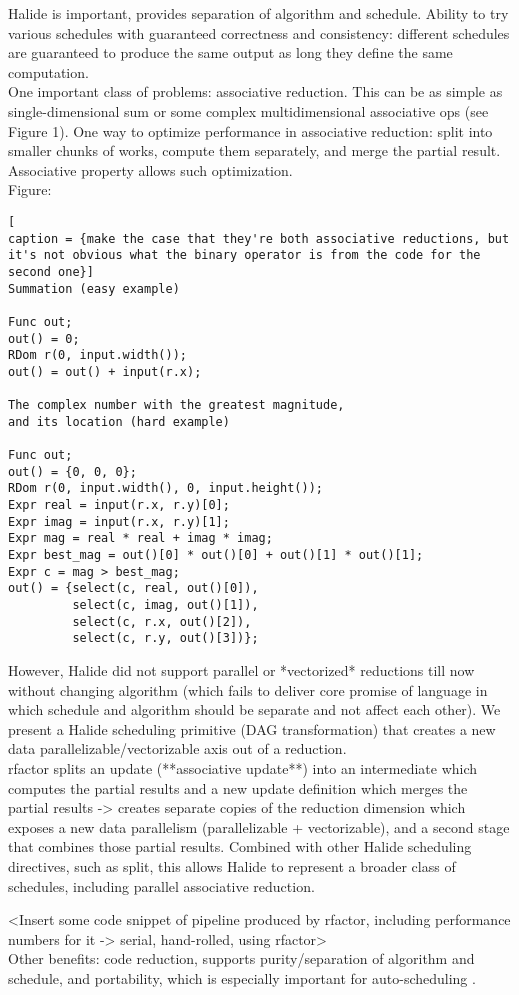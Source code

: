 Halide \cite{Ragan-Kelley:2013:HLC:2491956.2462176} is important, provides separation of algorithm and schedule. Ability to try various schedules with guaranteed correctness and consistency: different schedules are guaranteed to produce the same output as long they define the same computation. \\

One important class of problems: associative reduction. This can be as simple as single-dimensional sum or some complex multidimensional associative ops (see Figure 1). One way to optimize performance in associative reduction: split into smaller chunks of works, compute them separately, and merge the partial result. Associative property allows such optimization. \\

Figure:

\begin{lstlisting}[
caption = {make the case that they're both associative reductions, but it's not obvious what the binary operator is from the code for the second one}]
Summation (easy example)

Func out;
out() = 0;
RDom r(0, input.width());
out() = out() + input(r.x);

The complex number with the greatest magnitude, 
and its location (hard example)

Func out;
out() = {0, 0, 0};
RDom r(0, input.width(), 0, input.height());
Expr real = input(r.x, r.y)[0];
Expr imag = input(r.x, r.y)[1];
Expr mag = real * real + imag * imag;
Expr best_mag = out()[0] * out()[0] + out()[1] * out()[1];
Expr c = mag > best_mag;
out() = {select(c, real, out()[0]),
         select(c, imag, out()[1]),
         select(c, r.x, out()[2]),
         select(c, r.y, out()[3])};
\end{lstlisting}

However, Halide did not support parallel or *vectorized* reductions till now without changing algorithm (which fails to deliver core promise of language in which schedule and algorithm should be separate and not affect each other). We present a Halide scheduling primitive (DAG transformation) that creates a new data parallelizable/vectorizable axis out of a reduction. \\

rfactor splits an update (**associative update**) into an intermediate which computes the partial results and a new update definition which merges the partial results -> creates separate copies of the reduction dimension which exposes a new data parallelism (parallelizable + vectorizable), and a second stage that combines those partial results. Combined with other Halide scheduling directives, such as split, this allows Halide to represent a broader class of schedules, including parallel associative reduction. 

<Insert some code snippet of pipeline produced by rfactor, including performance numbers for it -> serial, hand-rolled, using rfactor> \\

Other benefits: code reduction, supports purity/separation of algorithm and schedule, and portability, which is especially important for auto-scheduling \cite{Mullapudi:2016:ASH:2897824.2925952}. \\
